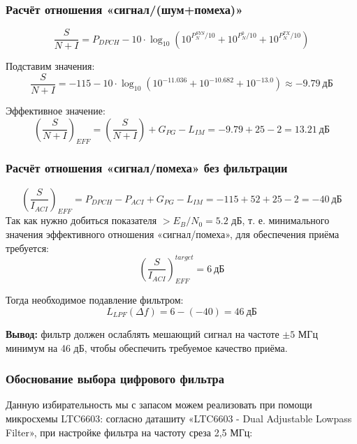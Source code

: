 \documentclass[a4paper,12pt]{article}
\begin{document}
\subsubsection{Расчёт отношения «сигнал/(шум+помеха)»}
\begin{equation}
\frac{S}{N + I} = P_{DPCH} - 10 \cdot \log_{10} \left(10^{P_{N}^{SYS}/10} + 10^{P_{N}^{0}/10} + 10^{P_{N}^{TX}/10} \right)
\end{equation}

Подставим значения:
\begin{equation}
\frac{S}{N + I} = -115 - 10 \cdot \log_{10} \left(10^{-11.036} + 10^{-10.682} + 10^{-13.0} \right) \approx -9.79\ \text{дБ}
\end{equation}

Эффективное значение:
\begin{equation}
\left( \frac{S}{N + I} \right)_{EFF} = \left( \frac{S}{N + I} \right) + G_{PG} - L_{IM} = -9.79 + 25 - 2 = 13.21\ \text{дБ}
\end{equation}



\subsubsection{Расчёт отношения «сигнал/помеха» без фильтрации}
\begin{equation}
\left( \frac{S}{I_{ACI}} \right)_{EFF} = P_{DPCH} - P_{ACI} + G_{PG} - L_{IM} = -115 + 52 + 25 - 2 = -40\ \text{дБ}
\end{equation}
Так как нужно добиться показателя $>E_B/N_0 =5.2$ дБ, т. е.  минимального значения эффективного отношения «сигнал/помеха», для обеспечения приёма требуется:
\begin{equation}
\left( \frac{S}{I_{ACI}} \right)_{EFF}^{target} = 6\ \text{дБ}
\end{equation}

Тогда необходимое подавление фильтром:
\begin{equation}
L_{LPF}(\Delta f) = 6 - (-40) = 46\ \text{дБ}
\end{equation}

\textbf{Вывод:} фильтр должен ослаблять мешающий сигнал на частоте $\pm5$ МГц минимум на 46 дБ, чтобы обеспечить требуемое качество приёма.  

\subsubsection{Обоснование выбора цифрового фильтра}
Данную избирательность мы с запасом можем реализовать при помощи микросхемы LTC6603: согласно  даташиту «LTC6603 - Dual Adjustable Lowpass Filter», при настройке фильтра на частоту среза 2,5 МГц:​
\end{document}
